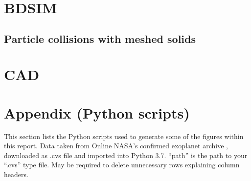 \documentclass[12pt,a4paper]{article}
\begin{document}
\section{BDSIM}
\subsection{Particle collisions with meshed solids}

\section{CAD}


 
\newpage

%
%




\newpage
\section{Appendix (Python scripts)}
This section lists the Python scripts used to generate some of the figures within this report.
Data taken from Online NASA's confirmed exoplanet archive \cite{arch}, downloaded as .cvs file and imported into Python 3.7. ``path'' is the path to your ``.cvs'' type file. May be required to delete unnecessary rows explaining column headers.
%
%
%
\end{document}
